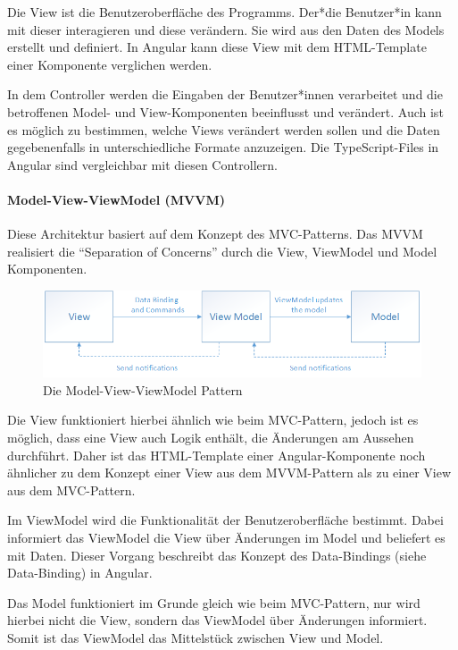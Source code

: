 Die View ist die Benutzeroberfläche des Programms. Der*die Benutzer*in kann mit dieser interagieren und diese verändern. Sie wird aus den Daten des Models erstellt und definiert. In Angular kann diese View mit dem HTML-Template einer Komponente verglichen werden.

In dem Controller werden die Eingaben der Benutzer*innen verarbeitet und die betroffenen Model- und View-Komponenten beeinflusst und verändert. Auch ist es möglich zu bestimmen, welche Views verändert werden sollen und die Daten gegebenenfalls in unterschiedliche Formate anzuzeigen. Die TypeScript-Files in Angular sind vergleichbar mit diesen Controllern.
\cite{MVC}

\paragraph{Model-View-ViewModel (MVVM)}
Diese Architektur basiert auf dem Konzept des MVC-Patterns. Das MVVM realisiert die “Separation of Concerns” durch die View, ViewModel und Model Komponenten.

\begin{figure} [h t]
  \centering
  \includegraphics[scale=0.5]{pics/mvvm-pattern.png}
  \caption{Die Model-View-ViewModel Pattern \cite{MVVM}}
  \label{fig:tech:front:mvc-architecture}
\end{figure}

Die View funktioniert hierbei ähnlich wie beim MVC-Pattern, jedoch ist es möglich, dass eine View auch Logik enthält, die Änderungen am Aussehen durchführt. Daher ist das HTML-Template einer Angular-Komponente noch ähnlicher zu dem Konzept einer View aus dem MVVM-Pattern als zu einer View aus dem MVC-Pattern. 

Im ViewModel wird die Funktionalität der Benutzeroberfläche bestimmt. Dabei informiert das ViewModel die View über Änderungen im Model und beliefert es mit Daten. Dieser Vorgang beschreibt das Konzept des Data-Bindings (siehe Data-Binding) in Angular.  

Das Model funktioniert im Grunde gleich wie beim MVC-Pattern, nur wird hierbei nicht die View, sondern das ViewModel über Änderungen informiert. Somit ist das ViewModel das Mittelstück zwischen View und Model.

